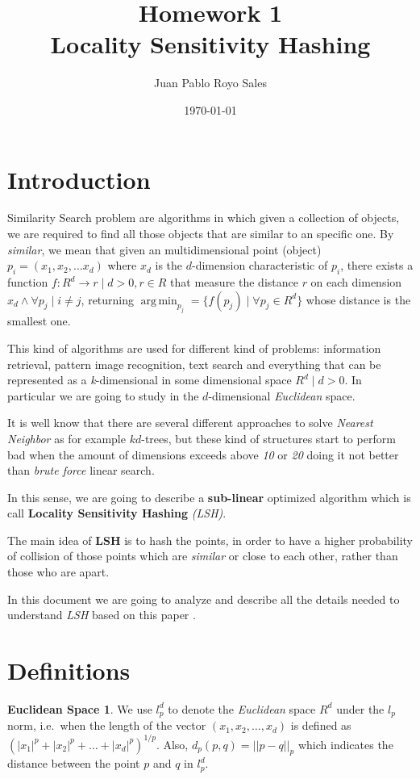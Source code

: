 \documentclass[12pt, a4paper]{article}
\title{%
      Homework 1 \\
      Locality Sensitivity Hashing
    }
\author{Juan Pablo Royo Sales}
\date\today
\DeclareMathOperator*{\argmin}{arg\,min}
\theoremstyle{definition}
\newtheorem*{euclidean}{Euclidean Space}
\begin{document}
\maketitle

\section{Introduction}
Similarity Search problem are algorithms in which given a collection of objects, we are required to find all those objects that are similar to an specific one. By \textit{similar}, we mean that given an multidimensional point (object) $p_i = (x_1, x_2, \dots x_d)$ where $x_d$ is the $d$-dimension characteristic of $p_i$, there exists a function $f: R^d \to r \mid d > 0, r \in R$ that measure the distance $r$ on each dimension $x_d \land \forall p_j \mid i \neq j$, returning $\argmin_{p_j} = \{ f(p_j) \mid \forall p_j \in R^d \}$ whose distance is the smallest one.

This kind of algorithms are used for different kind of problems: information retrieval, pattern image recognition, text search and everything that can be represented as a \textit{k}-dimensional in some dimensional space $R^d \mid d > 0$. In particular we are going to study in the $d$-dimensional \textit{Euclidean} space.

It is well know that there are several different approaches to solve \textit{Nearest Neighbor} as for example $kd$-trees, but these kind of structures start to perform bad when the amount of dimensions exceeds above \textit{10} or \textit{20} doing it not better than \textit{brute force} linear search.

In this sense, we are going to describe a \textbf{sub-linear} optimized algorithm which is call \textbf{Locality Sensitivity Hashing} \textit{(LSH)}.

The main idea of \textbf{LSH} is to hash the points, in order to have a higher probability of collision of those points which are \textit{similar} or close to each other, rather than those who are apart.

In this document we are going to analyze and describe all the details needed to understand \textit{LSH} based on this paper \cite{gionis_sim_search}.

\section{Definitions}

\begin{euclidean}
  We use $l^{d}_p$ to denote the \textit{Euclidean} space $R^d$ under the $l_p$ norm, i.e.\ when the length of the vector $(x_1, x_2, \dots, x_d)$ is defined as $(|x_1|^p + |x_2|^p + \dots + |x_d|^p)^{1/p}$. Also, $d_p(p,q) = || p - q ||_p$ which indicates the distance between the point $p$ and $q$ in $l^{d}_p$.
\end{euclidean}
\end{document}
